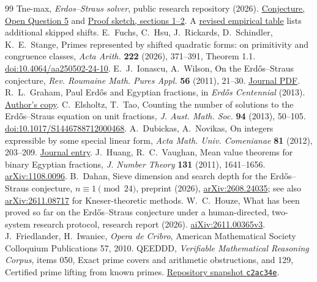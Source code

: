 \documentclass[a4paper,11pt]{article}
\theoremstyle{definition}\newtheorem{question}[theorem]{Question}
\newcommand{\arxiv}[1]{\href{https://arxiv.org/abs/#1}{arXiv:#1}}
\begin{document}
\begin{thebibliography}{99}\small
{} Tne-max, \emph{Erdos--Straus solver}, public research repository (2026).
\href{https://github.com/Tne-max/erdos-straus-solver/blob/7a011457cd72404e1d02943488a7b80f8a9ec636/CONJECTURE.md}{Conjecture, Open Question 5} and
\href{https://github.com/Tne-max/erdos-straus-solver/blob/8184c788e52f606e793a742729b0d5e74fca3420/PROOF_SKETCH.md}{Proof sketch, sections 1--2}. A
\href{https://github.com/GUINEA-PIG-TRENCH/erdos-straus-solver/blob/b6e0ae6d7885c84082e5c654a3b9bdfbe02bd307/CONJECTURE.md}{revised empirical table} lists additional skipped shifts.
 E.~Fuchs, C.~Hsu, J.~Rickards, D.~Schindler, K.~E.~Stange,
Primes represented by shifted quadratic forms: on primitivity and congruence classes, \emph{Acta Arith.} \textbf{222} (2026), 371--391, Theorem 1.1.
\href{https://doi.org/10.4064/aa250502-24-10}{doi:10.4064/aa250502-24-10}.
 E.~J.~Ionascu, A.~Wilson, On the Erd\H os--Straus conjecture, \emph{Rev. Roumaine Math. Pures Appl.} \textbf{56} (2011), 21--30.
\href{https://www.csm.ro/reviste/Revue_Mathematique/pdfs/2011/1/Ionascu.pdf}{Journal PDF}.
 R.~L.~Graham, Paul Erd\H os and Egyptian fractions, in \emph{Erd\H os Centennial} (2013). \href{https://mathweb.ucsd.edu/~ronspubs/13_03_Egyptian.pdf}{Author's copy}.
 C.~Elsholtz, T.~Tao, Counting the number of solutions to the Erd\H os--Straus equation on unit fractions, \emph{J. Aust. Math. Soc.} \textbf{94} (2013), 50--105.
\href{https://doi.org/10.1017/S1446788712000468}{doi:10.1017/S1446788712000468}.
 A.~Dubickas, A.~Novikas, On integers expressible by some special linear form, \emph{Acta Math. Univ. Comenianae} \textbf{81} (2012), 203--209. \href{https://www.iam.fmph.uniba.sk/amuc/_vol-81/_no_2/_dubickas/dubickas.html}{Journal entry}.
 J.~Huang, R.~C.~Vaughan, Mean value theorems for binary Egyptian fractions, \emph{J. Number Theory} \textbf{131} (2011), 1641--1656. \arxiv{1108.0096}.
 B.~Dahan, Sieve dimension and search depth for the Erd\H os--Straus conjecture, $n\equiv1\pmod{24}$, preprint (2026), \arxiv{2608.24035}; see also \arxiv{2611.08717} for Kneser-theoretic methods.
 W.~C.~Houze, What has been proved so far on the Erd\H os--Straus conjecture under a human-directed, two-system research protocol, research report (2026).
\href{https://aixiv.online/abs/2611.00365v3}{aiXiv:2611.00365v3}.
 J.~Friedlander, H.~Iwaniec, \emph{Opera de Cribro}, American Mathematical Society Colloquium Publications 57, 2010.
 QEEDDD, \emph{Verifiable Mathematical Reasoning Corpus}, items 050, Exact prime covers and arithmetic obstructions, and 129, Certified prime lifting from known primes.
\href{https://github.com/QEEDDD/Verifiable-Mathematical-Reasoning-Corpus/tree/c2ac34ea4622778187173f41bb1996deee8081b7}{Repository snapshot \texttt{c2ac34e}}.
\end{thebibliography}
\end{document}
